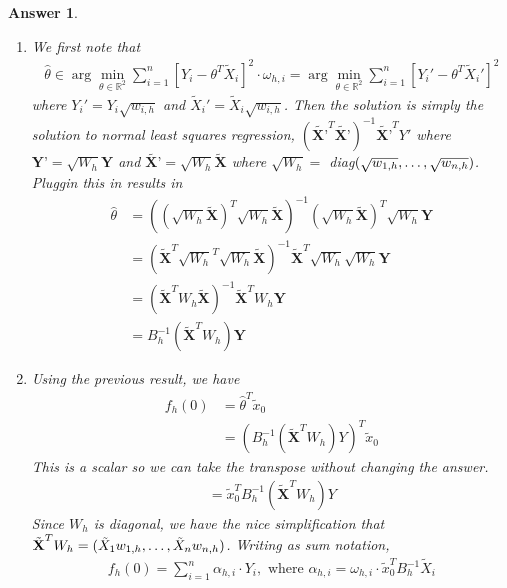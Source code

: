 \documentclass[12pt]{article}
\theoremstyle{colon}
\newtheorem*{answer}{Answer}
\begin{document}
\begin{answer}
  \leavevmode
  \begin{enumerate}[label=\arabic*)]
    \item We first note that
      \begin{gather*}
        \widehat{\theta} \in \arg\min_{\theta \in \mathbb{R}^2} \sum_{i=1}^n [Y_i - \theta^T \tilde{X}_i]^2 \cdot \omega_{h,i} = \arg\min_{\theta \in \mathbb{R}^2} \sum_{i=1}^n [Y_i' - \theta^T \tilde{X}_i']^2
      \end{gather*}
      where $Y_i' = Y_i \sqrt{w_{i,h}}$ and $\tilde{X}_i' = \tilde{X}_i \sqrt{w_{i,h}}$. Then the solution is simply the solution to normal least squares regression, $(\tilde{\textbf{X'}}^T \tilde{\textbf{X'}})^{-1} \tilde{\textbf{X'}}^T Y'$ where $\textbf{Y'} = \sqrt{W_h} \textbf{Y}$ and $\tilde{\textbf{X'}} = \sqrt{W_h} \tilde{\textbf{X}}$ where $\sqrt{W_h} =$ diag$(\sqrt{w_{1,h}}, \mathellipsis, \sqrt{w_{n,h}})$. Pluggin this in results in
      \begin{align*}
        \widehat{\theta} &= ((\sqrt{W_h} \tilde{\textbf{X}})^T \sqrt{W_h} \tilde{\textbf{X}})^{-1} (\sqrt{W_h} \tilde{\textbf{X}})^T \sqrt{W_h} \textbf{Y} \\
        &= (\tilde{\textbf{X}}^T \sqrt{W_h}^T \sqrt{W_h} \tilde{\textbf{X}})^{-1} \tilde{\textbf{X}}^T \sqrt{W_h} \sqrt{W_h} \textbf{Y} \\
        &= (\tilde{\textbf{X}}^T W_h \tilde{\textbf{X}})^{-1} \tilde{\textbf{X}}^T W_h \textbf{Y} \\
        &= B_h^{-1} (\tilde{\textbf{X}}^T W_h)\textbf{Y}
      \end{align*}

    \item Using the previous result, we have
      \begin{align*}
        f_h(0) &= \widehat{\theta}^T \tilde{x}_0 \\
        &= (B_h^{-1}(\tilde{\textbf{X}}^T W_h)Y)^T \tilde{x}_0
      \end{align*}
      This is a scalar so we can take the transpose without changing the answer.
      \begin{gather*}
        = \tilde{x}_0^T B_h^{-1}(\tilde{\textbf{X}}^T W_h)Y
      \end{gather*}
      Since $W_h$ is diagonal, we have the nice simplification that $\tilde{\textbf{X}}^T W_h = (\tilde{X}_1 w_{1,h}, \mathellipsis, \tilde{X}_n w_{n,h})$. Writing as sum notation,
      \begin{gather*}
        f_h(0) = \sum_{i=1}^n \alpha_{h,i} \cdot Y_i, \text{ where } \alpha_{h,i} = \omega_{h,i} \cdot \tilde{x}_0^T B_h^{-1} \tilde{X}_i
      \end{gather*}


\end{enumerate}
\end{answer}
\end{document}
